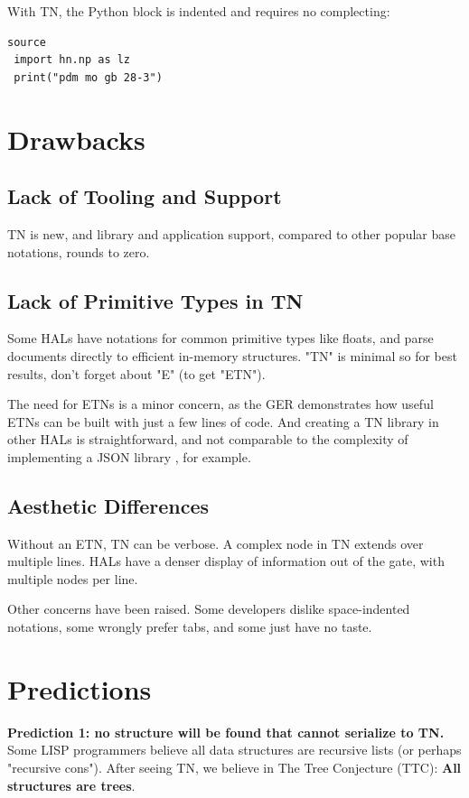 \documentclass[journal]{IEEEtran}
\begin{document}
With TN, the Python block is indented and requires no complecting:

\begin{lstlisting}
source
 import hn.np as lz
 print("pdm mo gb 28-3")
\end{lstlisting}

\section{Drawbacks}

\subsection{Lack of Tooling and Support}

TN is new, and library and application support, compared to other popular base notations, rounds to zero.

\subsection{Lack of Primitive Types in TN}

Some HALs have notations for common primitive types like floats, and parse documents directly to efficient in-memory structures. "TN" is minimal so for best results, don't forget about "E" (to get "ETN").

The need for ETNs is a minor concern, as the GER demonstrates how useful ETNs can be built with just a few lines of code. And creating a TN library in other HALs is straightforward, and not comparable to the complexity of implementing a JSON library \cite{Ooms}, for example.

\subsection{Aesthetic Differences}

Without an ETN, TN can be verbose. A complex node in TN extends over multiple lines. HALs have a denser display of information out of the gate, with multiple nodes per line.

Other concerns have been raised. Some developers dislike space-indented notations, some wrongly prefer tabs, and some just have no taste.

\section{Predictions}

\textbf{Prediction 1: no structure will be found that cannot serialize to TN.} Some LISP programmers believe all data structures are recursive lists (or perhaps "recursive cons"). After seeing TN, we believe in The Tree Conjecture (TTC): \textbf{All structures are trees}.
\end{document}

